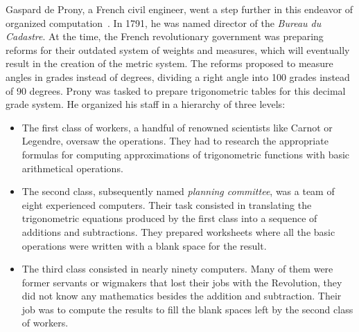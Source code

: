         Gaspard de Prony, a French civil engineer, went a step further in this endeavor of organized
        computation~\cite[Chapter~2]{human_computers}. In 1791, he was named director of the \emph{Bureau du Cadastre}.
        At the time, the French revolutionary government was preparing reforms for their outdated system of weights and
        measures, which will eventually result in the creation of the metric system. The reforms proposed to measure
        angles in grades instead of degrees, dividing a right angle into 100 grades instead of 90 degrees. Prony was
        tasked to prepare trigonometric tables for this decimal grade system. He organized his staff in a hierarchy of
        three levels:
        \begin{itemize}
            \item The first class of workers, a handful of renowned scientists like Carnot or Legendre, oversaw the
                operations. They had to research the appropriate formulas for computing approximations of trigonometric
                functions with basic arithmetical operations.
            \item The second class, subsequently named \emph{planning committee}, was a team of eight experienced
                computers. Their task consisted in translating the trigonometric equations produced by the first class
                into a sequence of additions and subtractions. They prepared worksheets where all the basic operations
                were written with a blank space for the result.
            \item The third class consisted in nearly ninety computers. Many of them were former servants or wigmakers
                that lost their jobs with the Revolution, they did not know any mathematics besides the addition and
                subtraction. Their job was to compute the results to fill the blank spaces left by the second class of
                workers.
        \end{itemize}

